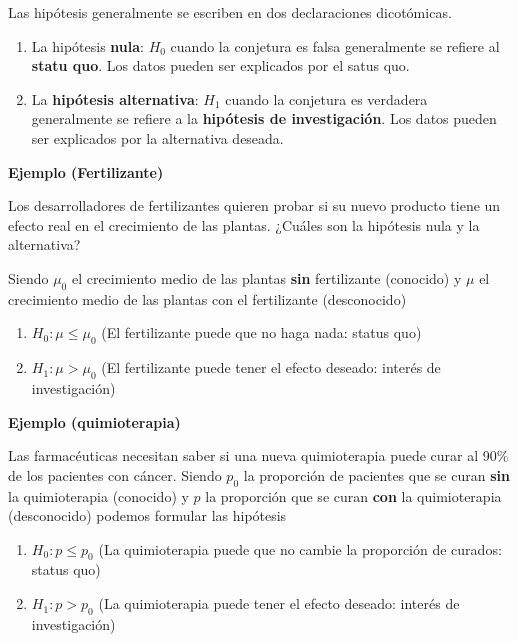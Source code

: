 \documentclass[
]{book}
\providecommand{\tightlist}{%
  \setlength{\itemsep}{0pt}\setlength{\parskip}{0pt}}
\begin{document}
Las hipótesis generalmente se escriben en dos declaraciones dicotómicas.

\begin{enumerate}
\def\labelenumi{\alph{enumi}.}
\item
  La hipótesis \textbf{nula}: \(H_0\) cuando la conjetura es falsa generalmente se refiere al \textbf{statu quo}. Los datos pueden ser explicados por el satus quo.
\item
  La \textbf{hipótesis alternativa}: \(H_1\) cuando la conjetura es verdadera generalmente se refiere a la \textbf{hipótesis de investigación}. Los datos pueden ser explicados por la alternativa deseada.
\end{enumerate}

\textbf{Ejemplo (Fertilizante)}

Los desarrolladores de fertilizantes quieren probar si su nuevo producto tiene un efecto real en el crecimiento de las plantas. ¿Cuáles son la hipótesis nula y la alternativa?

Siendo \(\mu_0\) el crecimiento medio de las plantas \textbf{sin} fertilizante (conocido) y \(\mu\) el crecimiento medio de las plantas con el fertilizante (desconocido)

\begin{enumerate}
\def\labelenumi{\alph{enumi}.}
\tightlist
\item
  \(H_0:\mu \leq \mu_0\) (El fertilizante puede que no haga nada: status quo)
\item
  \(H_1:\mu > \mu_0\) (El fertilizante puede tener el efecto deseado: interés de investigación)
\end{enumerate}

\textbf{Ejemplo (quimioterapia)}

Las farmacéuticas necesitan saber si una nueva quimioterapia puede curar al 90\% de los pacientes con cáncer. Siendo \(p_0\) la proporción de pacientes que se curan \textbf{sin} la quimioterapia (conocido) y \(p\) la proporción que se curan \textbf{con} la quimioterapia (desconocido) podemos formular las hipótesis

\begin{enumerate}
\def\labelenumi{\alph{enumi}.}
\tightlist
\item
  \(H_0:p \leq p_0\) (La quimioterapia puede que no cambie la proporción de curados: status quo)
\item
  \(H_1: p > p_0\) (La quimioterapia puede tener el efecto deseado: interés de investigación)
\end{enumerate}
\end{document}
